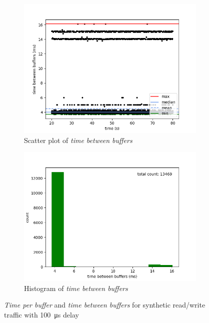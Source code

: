 \begin{figure}[H]
    \begin{subfigure}[t]{0.5\textwidth}
        \centering
        \includegraphics[scale=0.45]{img/synthetic_read_writes_wait_100us_between_buffers_scatter.png}
        \caption{Scatter plot of \textit{time between buffers}}
    \end{subfigure}%
    \begin{subfigure}[t]{0.5\textwidth}
        \centering
        \includegraphics[scale=0.45]{img/synthetic_read_writes_wait_100us_between_buffers_hist.png}
        \caption{Histogram of \textit{time between buffers}}
    \end{subfigure}

    \caption{\textit{Time per buffer} and \textit{time between buffers} for synthetic read/write traffic with \SI{100}{\micro\second} delay}
    \label{evaluation/results/synthetic-read-write-instructions-100us-delay/plots}
\end{figure}

